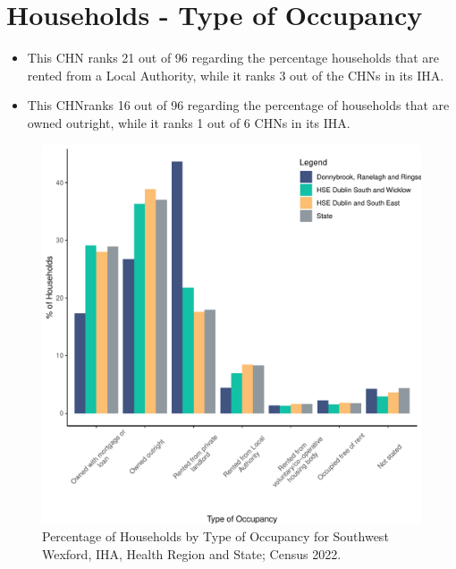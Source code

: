 \documentclass{article}
\begin{document}
\section{Households - Type of Occupancy}\label{sect:Households}
\begin{itemize}
\item This CHN ranks  21 out of 96 regarding the percentage households that are rented from a Local Authority, while it ranks  3 out of the CHNs in its IHA. 
\item This CHNranks  16 out of 96 regarding the percentage of households that are owned outright, while it ranks   1 out of 6 CHNs in its IHA.
\end{itemize}
\begin{figure}[H]
	\centering
	\includegraphics[width = 140mm]{../figures/HouseholdsED.pdf}
	\caption{Percentage of Households by Type of Occupancy for Southwest Wexford, IHA, Health Region and State; Census 2022.}
	\label{fig:vbnv}
	\end{figure}
\end{document}
